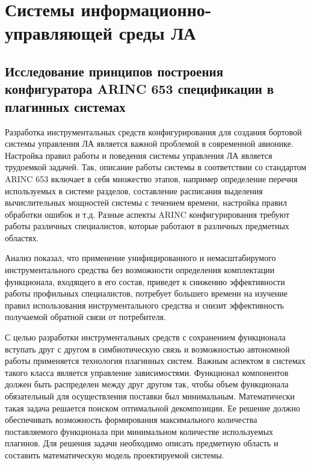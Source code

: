 \documentclass[14pt, a4paper]{article}
\begin{document}

\section*{Системы информационно-управляющей среды ЛА}

\subsection*{Исследование принципов построения конфигуратора ARINC 653 спецификации в плагинных системах}

Разработка инструментальных средств конфигурирования для создания бортовой системы управления ЛА является важной проблемой в современной авионике. Настройка правил работы и поведения системы управления ЛА является трудоемкой задачей. Так, описание работы системы в соответствии со стандартом ARINC 653 включает в себя множество этапов, например определение перечня используемых в системе разделов, составление расписания выделения вычислительных мощностей системы с течением времени, настройка правил обработки ошибок и т.д. Разные аспекты ARINC конфигурирования требуют работы различных специалистов, которые работают в различных предметных областях.

Анализ показал, что применение унифицированного и немасштабирумого инструментального средства без возможности определения комплектации функционала, входящего в его состав, приведет к снижению эффективности работы профильных специалистов, потребует большего времени на изучение правил использования инструментального средства и снизит эффективность получаемой обратной связи от потребителя.

С целью разработки инструментальных средств с сохранением функционала вступать друг с другом в симбиотическую связь и возможностью автономной работы применяется технология плагинных систем. Важным аспектом в системах такого класса является управление зависимостями. Функционал компонентов должен быть распределен между друг другом так, чтобы объем функционала обязательный для осуществления поставки был минимальным. Математически такая задача решается поиском оптимальной декомпозиции. Ее решение должно обеспечивать возможность формирования максимального количества поставляемого функционала при минимальном количестве используемых плагинов. Для решения задачи необходимо описать предметную область и составить математическую модель проектируемой системы.
\end{document}
